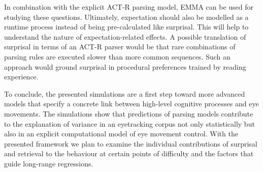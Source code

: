 In combination with the explicit ACT-R parsing model, EMMA can be used for studying these questions. 
Ultimately, expectation should also be modelled as a runtime process instead of being pre-calculated like surprisal. This will help to understand the nature of expectation-related effects. A possible translation of surprisal in terms of an ACT-R parser would be that rare combinations of parsing rules are executed slower than more common sequences. Such an approach would ground surprisal in procedural preferences trained by reading experience.

To conclude, the presented simulations are a first step toward more advanced models that specify a concrete link between high-level cognitive processes and eye movements.  The simulations show that predictions of parsing models contribute to the explanation of variance in an eyetracking corpus not only statistically but also in an explicit computational model of eye movement control.  
With the presented framework we plan to examine the individual contributions of surprisal and retrieval to the behaviour at certain points of difficulty and the factors that guide long-range regressions.

